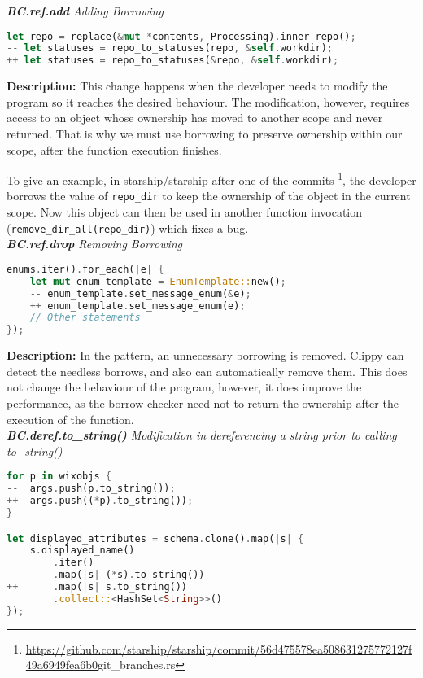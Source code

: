 \noindent\textit{\textbf{BC.ref.add} Adding Borrowing}

\begin{lstlisting}[language=Rust, style=colouredRust]
let repo = replace(&mut *contents, Processing).inner_repo();
-- let statuses = repo_to_statuses(repo, &self.workdir);
++ let statuses = repo_to_statuses(&repo, &self.workdir);
\end{lstlisting}

\noindent\textbf{Description:} This change happens when the developer needs to modify the program so it reaches the desired behaviour. The modification, however, requires access to an object whose ownership has moved to another scope and never returned. That is why we must use borrowing to preserve ownership within our scope, after the function execution finishes.

To give an example, in starship/starship after one of the commits \footnote{\url{https://github.com/starship/starship/commit/56d475578ea508631275772127f49a6949fea6b0}{git\_branches.rs}}, the developer borrows the value of \verb+repo_dir+ to keep the ownership of the object in the current scope. Now this object can then be used in another function invocation (\verb+remove_dir_all(repo_dir)+) which fixes a bug. \\

\noindent\textit{\textbf{BC.ref.drop} Removing Borrowing}

\begin{lstlisting}[language=Rust, style=colouredRust]
enums.iter().for_each(|e| {
    let mut enum_template = EnumTemplate::new();
    -- enum_template.set_message_enum(&e);
    ++ enum_template.set_message_enum(e);
    // Other statements
});
\end{lstlisting}

\noindent\textbf{Description:} In the pattern, an unnecessary borrowing is removed. Clippy can detect the needless borrows, and also can automatically remove them. This does not change the behaviour of the program, however, it does improve the performance, as the borrow checker need not to return the ownership after the execution of the function. \\


\noindent\textit{\textbf{BC.deref.to\_string()} Modification in dereferencing a string prior to calling to\_string()}

\begin{lstlisting}[language=Rust, style=colouredRust]
for p in wixobjs {
--  args.push(p.to_string());
++  args.push((*p).to_string());
}

let displayed_attributes = schema.clone().map(|s| {
    s.displayed_name()
        .iter()
--      .map(|s| (*s).to_string())
++      .map(|s| s.to_string())
        .collect::<HashSet<String>>()
});
\end{lstlisting}

